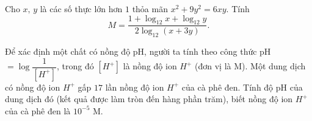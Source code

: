\begin{ex}%
	Cho $ x,\,y$ là các số thực lớn hơn $ 1$ thỏa mãn $x^2+9y^2=6xy$. Tính $$ M=\dfrac{1+\log_{12}x+\log_{12}y}{2\log_{12}\left(x+3y\right)}.$$
\end{ex}
\begin{ex}%
	Để xác định một chất có nồng độ pH, người ta tính theo công thức pH$=\log\dfrac{1}{\left[H^+\right]}$, trong đó $\left[H^+\right]$ là nồng độ ion $H^+$ (đơn vị là M). Một dung dịch có nồng độ ion $H^+$ gấp $17$ lần nồng độ ion $H^+$ của cà phê đen. Tính độ pH của dung dịch đó (kết quả được làm tròn đến hàng phần trăm), biết nồng độ ion $H^+$ của cà phê đen là $10^{-5}$ M.
\end{ex}

